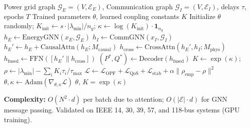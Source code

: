 
\begin{algorithm}[t]
\caption{JointOptimizer: Energy-Information Co-Optimization}
\label{alg:joint_optimizer}
\begin{algorithmic}[1]
\REQUIRE Power grid graph $\mathcal{G}_E = (V, \mathcal{E}_E)$, Communication graph $\mathcal{G}_I = (V, \mathcal{E}_I)$, delays $\tau$, epochs $T$
\ENSURE Trained parameters $\theta$, learned coupling constants $K$
\STATE Initialize $\theta$ randomly; $K_{\text{init}} \leftarrow s \cdot |\lambda_{\min}|/n_g$; $\kappa \leftarrow \log(K_{\text{init}}) \cdot \mathbf{1}_{n_g}$ 
        \STATE $h_E \leftarrow \text{EnergyGNN}(x_E, \mathcal{G}_E)$ 
        \STATE $h_I \leftarrow \text{CommGNN}(x_I, \mathcal{G}_I)$ 
        \STATE $h_E' \leftarrow h_E + \text{CausalAttn}(h_E; M_{\text{causal}})$ 
        \STATE $h_{\text{cross}} \leftarrow \text{CrossAttn}(h_E', h_I; M_{\text{phys}})$ 
        \STATE $h_{\text{fused}} \leftarrow \text{FFN}([h_E' \| h_{\text{cross}}])$ 
        \STATE $(P^*, Q^*) \leftarrow \text{Decoder}(h_{\text{fused}})$ 
        \STATE $K \leftarrow \exp(\kappa)$; \quad $\rho \leftarrow |\lambda_{\min}| - \sum_i K_i \tau_i / \tau_{\max}$ 
        \STATE $\mathcal{L} \leftarrow \mathcal{L}_{\text{OPF}} + \mathcal{L}_{\text{QoS}} + \mathcal{L}_{\text{stab}} + \alpha \|\rho_{\text{emp}} - \rho\|^2$
        \STATE $\theta, \kappa \leftarrow \text{Adam}(\nabla_{\theta,\kappa} \mathcal{L})$ 
    \ENDFOR
\ENDFOR
\RETURN $\theta$, $K = \exp(\kappa)$
\end{algorithmic}
\end{algorithm}

\textbf{Complexity:} $O(N^2 \cdot d)$ per batch due to attention; $O(|\mathcal{E}| \cdot d)$ for GNN message passing. Validated on IEEE 14, 30, 39, 57, and 118-bus systems (GPU training).
